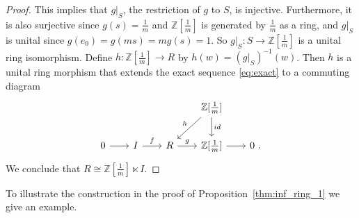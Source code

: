 \documentclass[12pt,a4paper]{amsart}
\theoremstyle{definition}
\newcommand{\Z}{\mathbb{Z}}
\begin{document}
\begin{proof}
This implies that $g|_S$, the restriction of $g$ to $S$, is injective. Furthermore, it is also surjective since $g(s)=\frac1m$ and $\Z[\frac1m]$ is generated by $\frac1m$ as a ring, and $g|_S$ is unital since $g(e_0)=g(ms)=mg(s)=1$.
So $g|_S \colon S \to \Z[\frac1m]$ is a unital ring isomorphism.
Define $h \colon \Z[\frac1m] \to R$ by $h(w)=(g|_S)^{-1}(w)$. Then $h$ is a unital ring morphism that extends the exact sequence \eqref{eq:exact} to a commuting diagram
$$\begin{tikzcd}[sep=20pt]
& & & \Z[\frac1m] & \\
0 & I & R & \Z[\frac1m] & 0 \ .
\arrow[from=2-1, to=2-2]
\arrow["f", from=2-2, to=2-3]
\arrow["g", from=2-3, to=2-4]
\arrow[from=2-4, to=2-5]
\arrow["h"', from=1-4, to=2-3]
\arrow["id", from=1-4, to=2-4]
\end{tikzcd}$$
We conclude that $R \cong \Z[\frac1m] \ltimes I$.
\end{proof}

To illustrate the construction in the proof of Proposition~\ref{thm:inf_ring_1} we give an example. 
\end{document}
